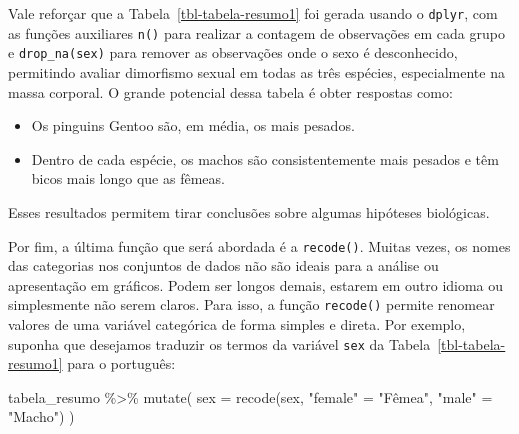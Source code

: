 \documentclass[
  12pt,
  letterpaper,
  DIV=11,
  numbers=noendperiod]{scrreprt}
\newenvironment{Shaded}{\begin{snugshade}}{\end{snugshade}}
\newcommand{\AttributeTok}[1]{\textcolor[rgb]{0.40,0.45,0.13}{#1}}
\newcommand{\FunctionTok}[1]{\textcolor[rgb]{0.28,0.35,0.67}{#1}}
\newcommand{\NormalTok}[1]{\textcolor[rgb]{0.00,0.23,0.31}{#1}}
\newcommand{\OtherTok}[1]{\textcolor[rgb]{0.00,0.23,0.31}{#1}}
\newcommand{\SpecialCharTok}[1]{\textcolor[rgb]{0.37,0.37,0.37}{#1}}
\newcommand{\StringTok}[1]{\textcolor[rgb]{0.13,0.47,0.30}{#1}}
\providecommand{\tightlist}{%
  \setlength{\itemsep}{0pt}\setlength{\parskip}{0pt}}\usepackage{longtable,booktabs,array}
\theoremstyle{definition}
\theoremstyle{exemplo}
\begin{document}
\noindent Vale reforçar que a Tabela~\ref{tbl-tabela-resumo1} foi gerada
usando o \texttt{dplyr}, com as funções auxiliares \texttt{n()} para
realizar a contagem de observações em cada grupo e
\texttt{drop\_na(sex)} para remover as observações onde o sexo é
desconhecido, permitindo avaliar dimorfismo sexual em todas as três
espécies, especialmente na massa corporal. O grande potencial dessa
tabela é obter respostas como:

\begin{itemize}
\tightlist
\item
  Os pinguins Gentoo são, em média, os mais pesados.
\item
  Dentro de cada espécie, os machos são consistentemente mais pesados e
  têm bicos mais longo que as fêmeas.
\end{itemize}

\noindent Esses resultados permitem tirar conclusões sobre algumas
hipóteses biológicas.

Por fim, a última função que será abordada é a \texttt{recode()}. Muitas
vezes, os nomes das categorias nos conjuntos de dados não são ideais
para a análise ou apresentação em gráficos. Podem ser longos demais,
estarem em outro idioma ou simplesmente não serem claros. Para isso, a
função \texttt{recode()} permite renomear valores de uma variável
categórica de forma simples e direta. Por exemplo, suponha que desejamos
traduzir os termos da variável \texttt{sex} da
Tabela~\ref{tbl-tabela-resumo1} para o português:

\begin{Shaded}
\begin{Highlighting}[]
\NormalTok{tabela\_resumo }\SpecialCharTok{\%\textgreater{}\%} 
  \FunctionTok{mutate}\NormalTok{(}
    \AttributeTok{sex =} \FunctionTok{recode}\NormalTok{(sex,}
                 \StringTok{"female"} \OtherTok{=} \StringTok{"Fêmea"}\NormalTok{,}
                 \StringTok{"male"} \OtherTok{=} \StringTok{"Macho"}\NormalTok{)}
\NormalTok{  ) }
\end{Highlighting}
\end{Shaded}
\end{document}
